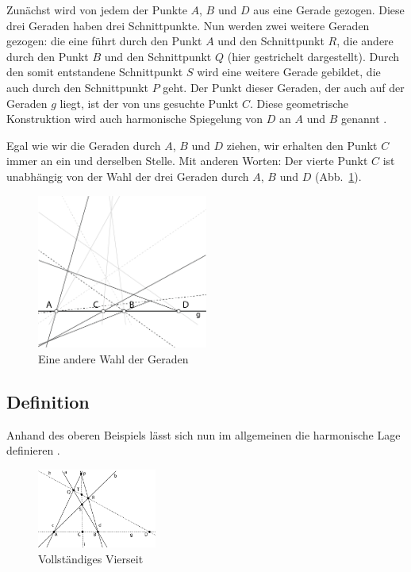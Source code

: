 \documentclass[12pt,a4paper]{article}
\begin{document}
Zunächst wird von jedem der Punkte $A$, $B$ und $D$ aus eine Gerade gezogen. Diese drei Geraden haben drei Schnittpunkte. Nun werden zwei weitere Geraden gezogen: die eine führt durch den Punkt $A$ und den Schnittpunkt $R$, die andere durch den Punkt $B$ und den Schnittpunkt $Q$ (hier gestrichelt dargestellt).
\newline
\newline
Durch den somit entstandene Schnittpunkt $S$ wird eine weitere Gerade gebildet, die auch durch den Schnittpunkt $P$ geht. Der Punkt dieser Geraden, der auch auf der Geraden $g$ liegt, ist der von uns gesuchte Punkt $C$. Diese geometrische Konstruktion wird auch harmonische Spiegelung von $D$ an $A$ und $B$ genannt \citep[vgl.~][S.~34]{harmonischeLage}.

Egal wie wir die Geraden durch $A$, $B$ und $D$ ziehen, wir erhalten den Punkt $C$ immer an ein und derselben Stelle. Mit anderen Worten: Der vierte Punkt $C$ ist unabhängig von der Wahl der drei Geraden durch $A$, $B$ und $D$ (Abb.~\ref{fig:AndereWahl}).

\begin{figure}[htbp]
\centering
\includegraphics[width=0.5\textwidth]{Bilder/fuer_mehrere_geraden.png}
\caption{Eine andere Wahl der Geraden}
\label{fig:AndereWahl}
\end{figure}

\newpage
\subsection{Definition}
Anhand des oberen Beispiels lässt sich nun im allgemeinen die harmonische Lage definieren \citep[S.~43, 45f]{projektiveGeometrie}.

\begin{figure}
\centering
\includegraphics[width=0.35\textwidth]{Bilder/vollstaendigesVierseit.png}
\caption{Vollständiges Vierseit}
\end{figure}
\end{document}
